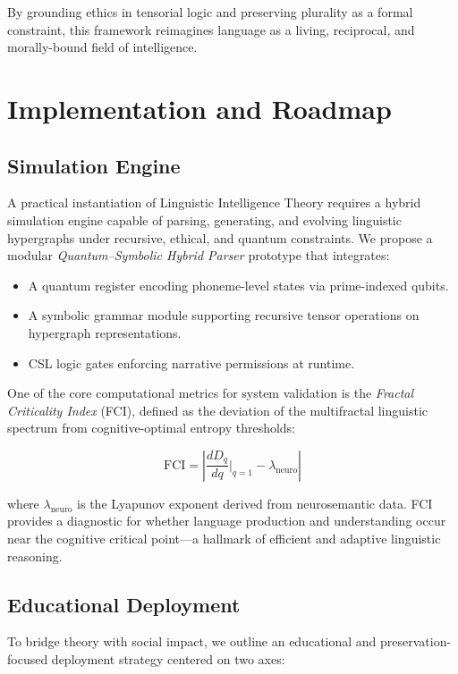 \documentclass{article}
\theoremstyle{plain}
\theoremstyle{claimstyle}
\begin{document}
By grounding ethics in tensorial logic and preserving plurality as a formal constraint, this framework reimagines language as a living, reciprocal, and morally-bound field of intelligence.

\section{Implementation and Roadmap}

\subsection{Simulation Engine}

A practical instantiation of Linguistic Intelligence Theory requires a hybrid simulation engine capable of parsing, generating, and evolving linguistic hypergraphs under recursive, ethical, and quantum constraints. We propose a modular \textit{Quantum–Symbolic Hybrid Parser} prototype that integrates:

\begin{itemize}
    \item A quantum register encoding phoneme-level states via prime-indexed qubits.
    \item A symbolic grammar module supporting recursive tensor operations on hypergraph representations.
    \item CSL logic gates enforcing narrative permissions at runtime.
\end{itemize}

One of the core computational metrics for system validation is the \textit{Fractal Criticality Index} (FCI), defined as the deviation of the multifractal linguistic spectrum from cognitive-optimal entropy thresholds:

\[
\text{FCI} = \left| \frac{dD_q}{dq}\Big|_{q=1} - \lambda_{\text{neuro}} \right|
\]

where $\lambda_{\text{neuro}}$ is the Lyapunov exponent derived from neurosemantic data. FCI provides a diagnostic for whether language production and understanding occur near the cognitive critical point—a hallmark of efficient and adaptive linguistic reasoning.

\subsection{Educational Deployment}

To bridge theory with social impact, we outline an educational and preservation-focused deployment strategy centered on two axes:
\end{document}
